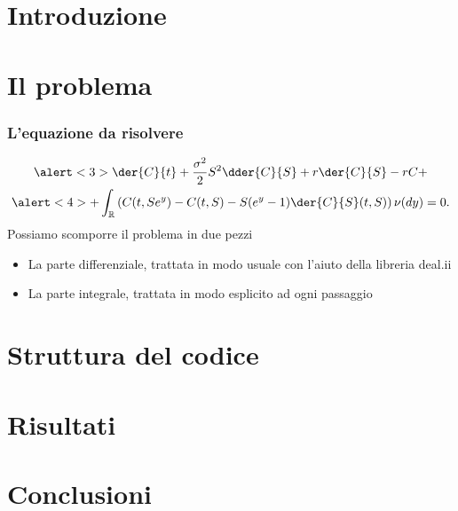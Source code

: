 \documentclass{beamer}
\begin{document}
\section{Introduzione}


\section{Il problema}

\begin{frame}
\frametitle{L'equazione da risolvere}
\begin{multline*}
\alert<3>{\der{C}{t}+\frac{\sigma^2}{2}S^2\dder{C}{S}+r\der{C}{S}-rC+}\\ \alert<4>{+ 
\int_\mathbb{R}\left(C(t,Se^y)-C(t,S)-S(e^y-1)\der{C}{S}(t,S)\right)\nu(dy)}=0.
\end{multline*}
Possiamo scomporre il problema in due pezzi
\begin{itemize}[<+->]
\item La parte differenziale, trattata in modo usuale con l'aiuto della libreria \textsf{deal.ii}
\item La parte integrale, trattata in modo esplicito ad ogni passaggio
\end{itemize}
\end{frame}

\section{Struttura del codice}

\section{Risultati}

\section{Conclusioni}
\end{document}
